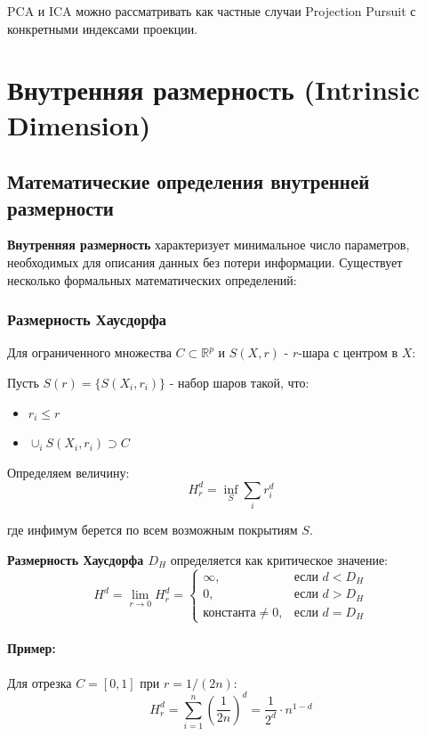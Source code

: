 \documentclass[a4paper,12pt]{article}
\begin{document}
PCA и ICA можно рассматривать как частные случаи Projection Pursuit с конкретными индексами проекции.

\section{Внутренняя размерность (Intrinsic Dimension)}

\subsection{Математические определения внутренней размерности}

\textbf{Внутренняя размерность} характеризует минимальное число параметров, необходимых для описания данных без потери информации. Существует несколько формальных математических определений:

\subsubsection{Размерность Хаусдорфа}

Для ограниченного множества $C \subset \mathbb{R}^p$ и $S(X, r)$ - $r$-шара с центром в $X$:

Пусть $S(r) = \{S(X_i, r_i)\}$ - набор шаров такой, что:
\begin{itemize}
    \item $r_i \leq r$
    \item $\cup_i S(X_i, r_i) \supset C$
\end{itemize}

Определяем величину:
\begin{equation}
    H_r^d = \inf_S \sum_i r_i^d
\end{equation}

где инфимум берется по всем возможным покрытиям $S$.

\textbf{Размерность Хаусдорфа $D_H$} определяется как критическое значение:
\begin{equation}
    H^d = \lim_{r \to 0} H_r^d = \begin{cases}
    \infty, & \text{если } d < D_H \\
    0, & \text{если } d > D_H \\
    \text{константа} \neq 0, & \text{если } d = D_H
    \end{cases}
\end{equation}

\paragraph{Пример:}
Для отрезка $C = [0, 1]$ при $r = 1/(2n)$:
\begin{equation}
    H_r^d = \sum_{i=1}^n \left(\frac{1}{2n}\right)^d = \frac{1}{2^d} \cdot n^{1-d}
\end{equation}
\end{document}
